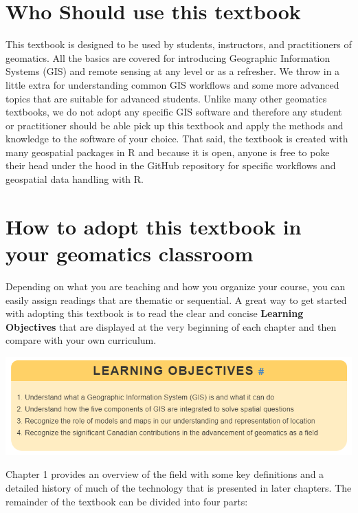 \documentclass[
]{book}
\begin{document}
\section*{Who Should use this textbook}\label{who-should-use-this-textbook}

This textbook is designed to be used by students, instructors, and practitioners of geomatics. All the basics are covered for introducing Geographic Information Systems (GIS) and remote sensing at any level or as a refresher. We throw in a little extra for understanding common GIS workflows and some more advanced topics that are suitable for advanced students. Unlike many other geomatics textbooks, we do not adopt any specific GIS software and therefore any student or practitioner should be able pick up this textbook and apply the methods and knowledge to the software of your choice. That said, the textbook is created with many geospatial packages in R and because it is open, anyone is free to poke their head under the hood in the GitHub repository for specific workflows and geospatial data handling with R.

\section*{How to adopt this textbook in your geomatics classroom}\label{how-to-adopt-this-textbook-in-your-geomatics-classroom}

Depending on what you are teaching and how you organize your course, you can easily assign readings that are thematic or sequential. A great way to get started with adopting this textbook is to read the clear and concise \textbf{Learning Objectives} that are displayed at the very beginning of each chapter and then compare with your own curriculum.

\includegraphics[width=0.75\linewidth]{images/00-learning-objectives}

Chapter 1 provides an overview of the field with some key definitions and a detailed history of much of the technology that is presented in later chapters. The remainder of the textbook can be divided into four parts:
\end{document}
